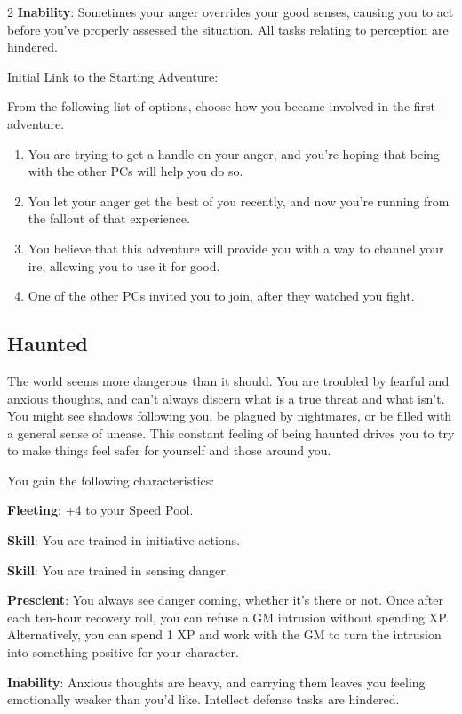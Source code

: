 \begin{multicols}{2}
\textbf{Inability}: Sometimes your anger overrides your good senses, causing you to act before you’ve properly assessed the situation. All tasks relating to perception are hindered.

Initial Link to the Starting Adventure:

From the following list of options, choose how you became involved in the first adventure.
\begin{enumerate}
\item You are trying to get a handle on your anger, and you’re hoping that being with the other PCs will help you do so.
\item You let your anger get the best of you recently, and now you’re running from the fallout of that experience.
\item You believe that this adventure will provide you with a way to channel your ire, allowing you to use it for good.
\item One of the other PCs invited you to join, after they watched you fight. 
\end{enumerate}

\subsection{Haunted}

The world seems more dangerous than it should. You are troubled by fearful and anxious thoughts, and can’t always discern what is a true threat and what isn’t. You might see shadows following you, be plagued by nightmares, or be filled with a general sense of unease. This constant feeling of being haunted drives you to try to make things feel safer for yourself and those around you.

You gain the following characteristics:

\textbf{Fleeting}: +4 to your Speed Pool.

\textbf{Skill}: You are trained in initiative actions.

\textbf{Skill}: You are trained in sensing danger.

\textbf{Prescient}: You always see danger coming, whether it’s there or not. Once after each ten-hour recovery roll, you can refuse a GM intrusion without spending XP. Alternatively, you can spend 1 XP and work with the GM to turn the intrusion into something positive for your character.

\textbf{Inability}: Anxious thoughts are heavy, and carrying them leaves you feeling emotionally weaker than you’d like. Intellect defense tasks are hindered.


\end{multicols}
